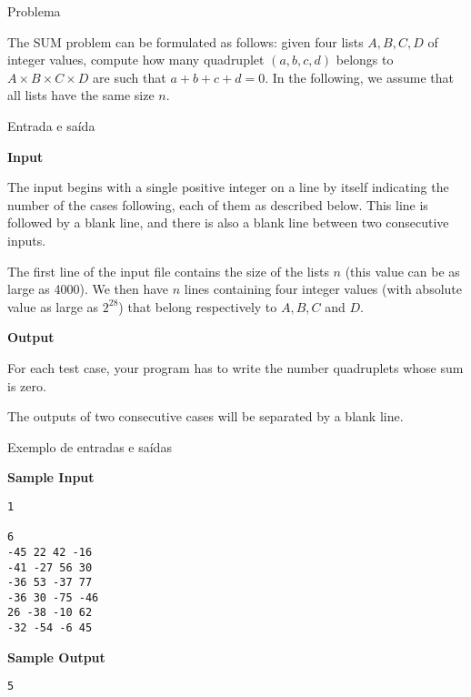 
\begin{frame}[fragile]{Problema}

The SUM problem can be formulated as follows: given four lists $A, B, C, D$ of integer values, 
compute how many quadruplet $(a, b, c, d)$ belongs to $A\times B\times C\times D$ are such that 
$a + b + c + d = 0$. In the following, we assume that all lists have the same size $n$.

\end{frame}

\begin{frame}[fragile]{Entrada e saída}

\textbf{Input}

The input begins with a single positive integer on a line by itself indicating the number of the 
cases following, each of them as described below. This line is followed by a blank line, and 
there is also a blank line between two consecutive inputs.

The first line of the input file contains the size of the lists $n$ (this value can be as large as 
4000).  We then have $n$ lines containing four integer values (with absolute value as large as 
$2^{28}$) that belong respectively to $A, B, C$ and $D$. 

\vspace{0.1in}

\textbf{Output}

For each test case, your program has to write the number quadruplets whose sum is zero.

The outputs of two consecutive cases will be separated by a blank line.

\end{frame}

\begin{frame}[fragile]{Exemplo de entradas e saídas}

\begin{minipage}[t]{0.45\textwidth}
\textbf{Sample Input}
\begin{verbatim}
1

6
-45 22 42 -16
-41 -27 56 30
-36 53 -37 77
-36 30 -75 -46
26 -38 -10 62
-32 -54 -6 45
\end{verbatim}
\end{minipage}
\begin{minipage}[t]{0.5\textwidth}
\textbf{Sample Output}
\begin{verbatim}
5
\end{verbatim}
\end{minipage}
\end{frame}

